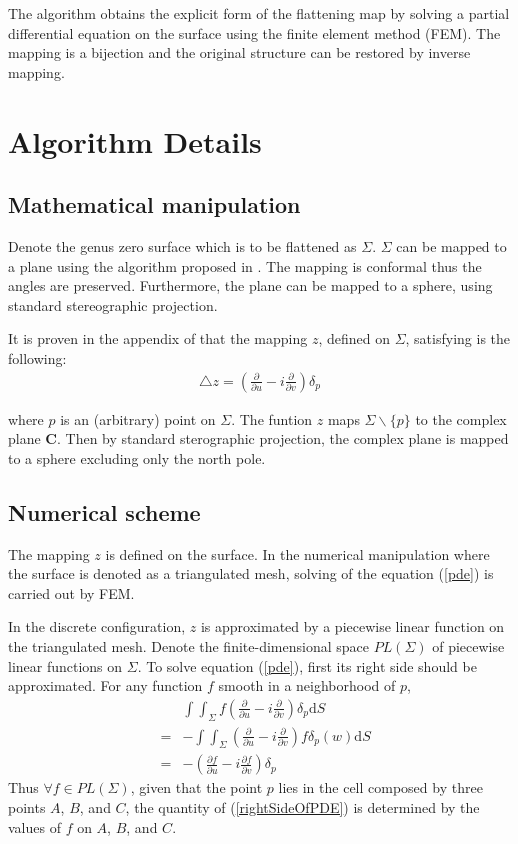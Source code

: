 \documentclass{InsightArticle}
\begin{document}
The algorithm obtains the explicit form of the flattening map by
solving a partial differential equation on the surface using the
finite element method (FEM). The mapping is a bijection and the
original structure can be restored by inverse mapping.

\section{Algorithm Details}

\subsection{Mathematical manipulation}
  Denote the genus zero surface which is to be flattened as $\Sigma$.
  $\Sigma$ can be mapped to a plane using the algorithm proposed in
  \cite{angenent1999lbo}. The mapping is conformal thus the angles are
  preserved. Furthermore, the plane can be mapped to a sphere, using
  standard stereographic projection.
  
  It is proven in the appendix of \cite{angenent1999lbo} that the mapping
  $z$, defined on $\Sigma$, satisfying is the following:
  \begin{eqnarray}
    \triangle z = (\frac{\partial}{\partial u} - i\frac{\partial}{\partial v})\delta_p 
    \label{pde}
  \end{eqnarray}
  
  where $p$ is an (arbitrary) point on $\Sigma$. The funtion $z$ maps
  $\Sigma \backslash \{p\}$ to the complex plane $\mathbf{C}$. Then by
  standard sterographic projection, the complex plane is mapped to a
  sphere excluding only the north pole.

  \subsection{Numerical scheme}
  The mapping $z$ is defined on the surface. In the numerical
  manipulation where the surface is denoted as a triangulated mesh,
  solving of the equation (\ref{pde}) is carried out by FEM.
  
  In the discrete configuration, $z$ is approximated by a piecewise
  linear function on the triangulated mesh. Denote the
  finite-dimensional space $PL(\Sigma)$ of piecewise linear functions
  on $\Sigma$. To solve equation (\ref{pde}), first its right side
  should be approximated. For any function $f$ smooth in a
  neighborhood of $p$,
  \begin{eqnarray}
    && \int\int_{\Sigma} f (\frac{\partial}{\partial u} - i\frac{\partial}{\partial v})\delta_p \mathrm{d}S \nonumber \\
    &=& - \int\int_{\Sigma}(\frac{\partial}{\partial u} - i\frac{\partial}{\partial v})f \delta_p(w) \mathrm{d}S \nonumber \\
    &=& -(\frac{\partial f}{\partial u} - i\frac{\partial f}{\partial v})\delta_p \label{rightSideOfPDE}
  \end{eqnarray}  
  Thus $\forall f \in PL(\Sigma)$, given that the point $p$ lies in
  the cell composed by three points $A$, $B$, and $C$, the quantity of
  (\ref{rightSideOfPDE}) is determined by the values of $f$ on $A$,
  $B$, and $C$.
  
\end{document}

